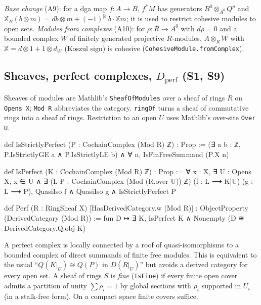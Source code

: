 \documentclass[11pt,a4paper]{article}
\newcommand{\code}[1]{\texttt{#1}}
\newcommand{\Dperf}{D_{\mathrm{perf}}}
\newcommand{\X}{\mathbb{X}}
\begin{document}
\emph{Base change} (A9): for a dga map $f\colon A\to B$, $f^*M$ has generators
$B^0\otimes_{A^0}Q^p$ and $\X_B(b\otimes m)=db\otimes m+(-1)^{|b|}b\cdot\X m$; it is used to
restrict cohesive modules to open sets. \emph{Modules from complexes} (A10): for $\rho\colon R\to
A^0$ with $d\rho=0$ and a bounded complex $W$ of finitely generated projective $R$-modules,
$A\otimes_R W$ with $\X=d\otimes1+1\otimes d_W$ (Koszul sign) is cohesive
(\code{CohesiveModule.fromComplex}).

\subsection{\texorpdfstring{Sheaves, perfect complexes, $\Dperf$ (S1, S9)}{Sheaves, perfect complexes, D\_perf (S1, S9)}}\label{sec:perf}
Sheaves of modules are Mathlib's \code{SheafOfModules} over a sheaf of rings
$R$ on \code{Opens X}; \code{Mod R} abbreviates the category. \code{ringOf} turns a sheaf of
commutative rings into a sheaf of rings. Restriction to an open $U$ uses Mathlib's over-site
\code{Over U}.
\begin{lean}
def IsStrictlyPerfect (P : CochainComplex (Mod R) ℤ) : Prop :=
  (∃ a b : ℤ, P.IsStrictlyGE a ∧ P.IsStrictlyLE b) ∧ ∀ n, IsFinFreeSummand (P.X n)

def IsPerfect (K : CochainComplex (Mod R) ℤ) : Prop :=
  ∀ x : X, ∃ U : Opens X, x ∈ U ∧
    ∃ (L P : CochainComplex (Mod (R.over U)) ℤ) (f : L ⟶ K|U) (g : L ⟶ P),
      QuasiIso f ∧ QuasiIso g ∧ IsStrictlyPerfect P

def Perf (R : RingSheaf X) [HasDerivedCategory.{w} (Mod R)] :
    ObjectProperty (DerivedCategory (Mod R)) :=
  fun D ↦ ∃ K, IsPerfect K ∧ Nonempty (D ≅ DerivedCategory.Q.obj K)
\end{lean}
A perfect complex is locally connected by a roof of quasi-isomorphisms to a bounded complex of
direct summands of finite free modules. This is equivalent to the usual
``$Q(K|_U)\cong Q(P)$ in $D(R|_U)$'' but avoids a derived category for every open set.
A sheaf of rings $S$ is \emph{fine} (\code{IsFine}) if every finite open cover admits a partition
of unity $\sum\rho_i=1$ by global sections with $\rho_i$ supported in $U_i$ (in a stalk-free
form). On a compact space finite covers suffice.
\end{document}
